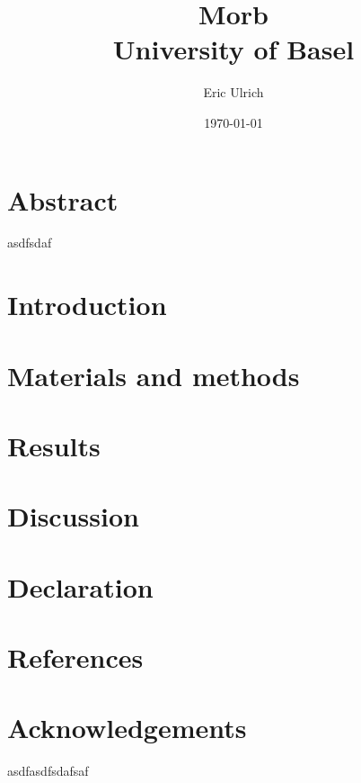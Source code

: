 \documentclass[12pt,twoside]{report}
\title{
    {Morb}\\
    {\large University of Basel}
}
\author{Eric Ulrich}
\date{\today}
\begin{document}
\maketitle

\pagestyle{empty} %
\tableofcontents


\chapter{Abstract}

asdfsdaf

\chapter{Introduction}



\chapter{Materials and methods}


\chapter{Results}


\chapter{Discussion}


\chapter{Declaration}


\chapter{References}

\printbibliography

\chapter{Acknowledgements}
asdfasdfsdafsaf
\end{document}
